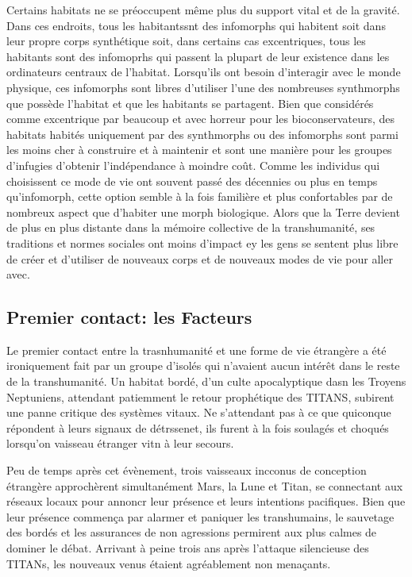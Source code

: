 Certains habitats ne se préoccupent même plus du support vital et de la gravité. Dans ces endroits, tous les habitantssnt des infomorphs qui habitent soit dans leur propre corps synthétique soit, dans certains cas excentriques, tous les habitants sont des infomoprhs qui passent la plupart de leur existence dans les ordinateurs centraux de l'habitat. Lorsqu'ils ont besoin d'interagir avec le monde physique, ces infomorphs sont libres d'utiliser l'une des nombreuses synthmorphs que possède l'habitat et que les habitants se partagent. Bien que considérés comme excentrique par beaucoup et avec horreur pour les bioconservateurs, des habitats habités uniquement par des synthmorphs ou des infomorphs sont parmi les moins cher à construire et à maintenir et sont une manière pour les groupes d'infugies d'obtenir l'indépendance à moindre coût. Comme les individus qui choisissent ce mode de vie ont souvent passé des décennies ou plus en temps qu'infomorph, cette option semble à la fois familière et plus confortables par de nombreux aspect que d'habiter une morph biologique. Alors que la Terre devient de plus en plus distante dans la mémoire collective de la transhumanité, ses traditions et normes sociales ont moins d'impact ey les gens se sentent plus libre de créer et d'utiliser de nouveaux corps et de nouveaux modes de vie pour aller avec. 

\subsection{Premier contact: les Facteurs} \label{sec:first-cont-fact} 

Le premier contact entre la trasnhumanité et une forme de vie étrangère a été ironiquement fait par un groupe d'isolés qui n'avaient aucun intérêt dans le reste de la transhumanité. Un habitat bordé, d'un culte apocalyptique dasn les Troyens Neptuniens, attendant patiemment le retour prophétique des TITANS, subirent une panne critique des systèmes vitaux. Ne s'attendant pas à ce que quiconque répondent à leurs signaux de détrssenet, ils furent à la fois soulagés et choqués lorsqu'on vaisseau étranger vitn à leur secours. 

Peu de temps après cet évènement, trois vaisseaux incconus de conception étrangère approchèrent simultanément Mars, la Lune et Titan, se connectant aux réseaux locaux pour annoncr leur présence et leurs intentions pacifiques. Bien que leur présence commença par alarmer et paniquer les transhumains, le sauvetage des bordés et les assurances de non agressions permirent aux plus calmes de dominer le débat. Arrivant à peine trois ans après l'attaque silencieuse des TITANs, les nouveaux venus étaient agréablement non menaçants. 

